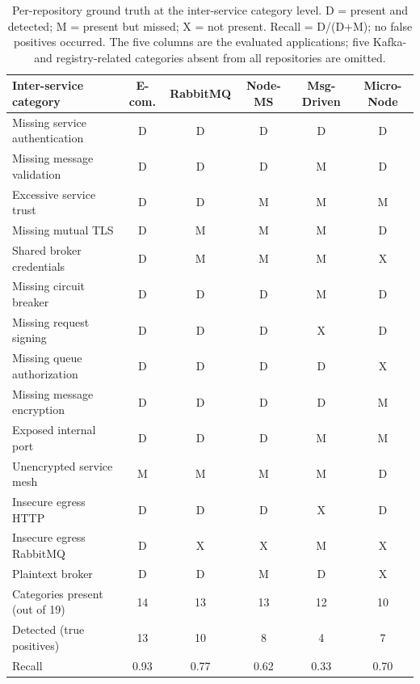 \documentclass[preprint,12pt]{elsarticle}
\newcommand{\new}[1]{#1}
\newcommand{\safefixtablestyle}{%
  \small
  \setlength{\tabcolsep}{5pt}
  \renewcommand{\arraystretch}{1.15}
}
\begin{document}
\begin{table}[!t]
\centering
\caption{\new{Per-repository ground truth at the inter-service category level. D = present and detected; M = present but missed; X = not present. Recall = D/(D+M); no false positives occurred. The five columns are the evaluated applications; five Kafka- and registry-related categories absent from all repositories are omitted.}}
\label{tab:presence_matrix}
\safefixtablestyle
\scriptsize
\setlength{\tabcolsep}{6pt}
\begin{tabular}{@{} l c c c c c @{}}
\toprule
Inter-service category & E-com. & RabbitMQ & Node-MS & Msg-Driven & Micro-Node \\
\midrule
Missing service authentication & D & D & D & D & D \\
Missing message validation & D & D & D & M & D \\
Excessive service trust & D & D & M & M & M \\
Missing mutual TLS & D & M & M & M & D \\
Shared broker credentials & D & M & M & M & X \\
Missing circuit breaker & D & D & D & M & D \\
Missing request signing & D & D & D & X & D \\
Missing queue authorization & D & D & D & D & X \\
Missing message encryption & D & D & D & D & M \\
Exposed internal port & D & D & D & M & M \\
Unencrypted service mesh & M & M & M & M & D \\
Insecure egress HTTP & D & D & D & X & D \\
Insecure egress RabbitMQ & D & X & X & M & X \\
Plaintext broker & D & D & M & D & X \\
\midrule
Categories present (out of 19) & 14 & 13 & 13 & 12 & 10 \\
Detected (true positives) & 13 & 10 & 8 & 4 & 7 \\
Recall & 0.93 & 0.77 & 0.62 & 0.33 & 0.70 \\
\bottomrule
\end{tabular}
\end{table}
\end{document}
